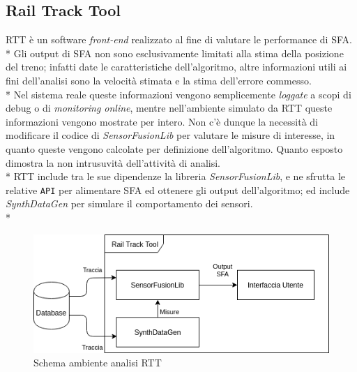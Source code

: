 \subsection{Rail Track Tool}
RTT \`e un software \emph{front-end} realizzato al fine di valutare le performance di SFA.\\*
Gli output di SFA non sono esclusivamente limitati alla stima della posizione del treno; infatti date le caratteristiche dell'algoritmo, altre informazioni utili ai fini dell'analisi sono la velocit\`a stimata e la stima dell'errore commesso.\\*
Nel sistema reale queste informazioni vengono semplicemente \emph{loggate} a scopi di debug o di \emph{monitoring online}, mentre nell'ambiente simulato da RTT queste informazioni vengono mostrate per intero. Non c'\`e dunque la necessit\`a di modificare il codice di \emph{SensorFusionLib} per valutare le misure di interesse, in quanto queste vengono calcolate per definizione dell'algoritmo. Quanto esposto dimostra la non intrusuvit\`a dell'attivit\`a di analisi.\\*
RTT include tra le sue dipendenze la libreria \emph{SensorFusionLib}, e ne sfrutta le relative \texttt{API} per alimentare SFA ed ottenere gli output dell'algoritmo; ed include \emph{SynthDataGen} per simulare il comportamento dei sensori.\\*
\begin{figure}[h]
	\centering
	\includegraphics[width=0.7\linewidth]{img/RTTSchemaFull}
	\caption{Schema ambiente analisi RTT}
	\label{fig:rttfull}
\end{figure}
